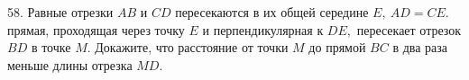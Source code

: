 58. Равные отрезки $AB$ и $CD$ пересекаются в их общей середине $E,\ AD=CE.$ прямая, проходящая через точку $E$ и перпендикулярная к $DE,$ пересекает отрезок $BD$ в точке $M.$ Докажите, что расстояние от точки $M$ до прямой $BC$ в два раза меньше длины отрезка $MD.$\\
